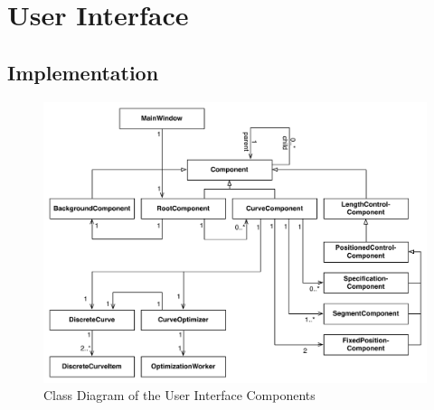\documentclass[a4paper]{article}
\begin{document}
		\section{User Interface}
			\subsection{Implementation}
				\begin{figure}[htb]
					\centering
					\includegraphics[width=\textwidth]{../resources/ui_components_class_diagram.pdf}
					\caption{Class Diagram of the User Interface Components}
					\label{figure:ui_components_class_diagram}
				\end{figure}
				
\end{document}
